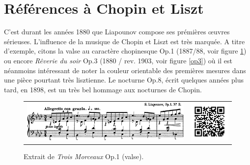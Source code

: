 \section{Références à Chopin et Liszt}

C'est durant les années 1880 que Liapounov compose ses prémières œuvres sérieuses. L'influence de la musique de Chopin et Liszt est très marquée. A titre d'exemple, citons la valse au caractère chopinesque Op.1 (1887/88, voir figure \ref{op1}) ou encore \emph{Rêverie du soir} Op.3 (1880 / rev. 1903, voir figure \ref{op3}) où il est néanmoins intéressant de noter la couleur orientable des premières mesures dans une pièce pourtant très lisztienne. Le nocturne Op.8, écrit quelques années plus tard, en 1898, est un très bel hommage aux nocturnes de Chopin.

\begin{figure}[!ht]
  \begin{bigcenter}
    \begin{tabular}{lr}
      \includegraphics[width=12.5cm, keepaspectratio]{op1.png}
      &
      \includegraphics[width=3cm, keepaspectratio]{op1-qr.png}
    \end{tabular}
  \end{bigcenter}
  \caption{\label{op1}Extrait de \emph{Trois Morceaux} Op.1  (valse).}
\end{figure}

